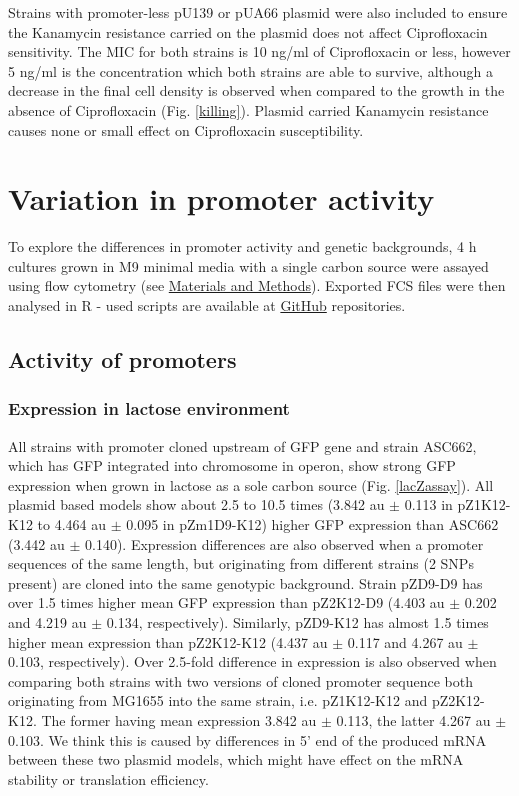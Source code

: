 Strains with promoter-less pU139 or pUA66 plasmid were also included to ensure the Kanamycin resistance carried on the plasmid does not affect Ciprofloxacin sensitivity.
The MIC for both strains is 10 ng/ml of Ciprofloxacin or less, however 5 ng/ml is the concentration which both strains are able to survive, although a decrease in the final cell density is observed when compared to the growth in the absence of Ciprofloxacin (Fig. \ref{killing}).
Plasmid carried Kanamycin resistance causes none or small effect on Ciprofloxacin susceptibility.


\section{Variation in promoter activity}
To explore the differences in promoter activity and genetic backgrounds, 4 h cultures grown in M9 minimal media with a single carbon source were assayed using flow cytometry (see \hyperlink{FC}{Materials and Methods}).
Exported FCS files were then analysed in R - used scripts are available at \href{https://github.com/marketavlkova/}{GitHub} repositories.

\subsection{Activity of  promoters}
\subsubsection{Expression in lactose environment}
All strains with  promoter cloned upstream of GFP gene and strain ASC662, which has GFP integrated into chromosome in  operon, show strong GFP expression when grown in lactose as a sole carbon source (Fig. \ref{lacZassay}).
All plasmid based models show about 2.5 to 10.5 times (3.842 au $\pm$ 0.113 in pZ1\textunderscore K12-K12 to 4.464 au $\pm$ 0.095 in pZm1\textunderscore D9-K12) higher GFP expression than ASC662 (3.442 au $\pm$ 0.140).
Expression differences are also observed when a promoter sequences of the same length, but originating from different strains (2 SNPs present) are cloned into the same genotypic background.
Strain pZ\textunderscore D9-D9 has over 1.5 times higher mean GFP expression than pZ2\textunderscore K12-D9 (4.403 au $\pm$ 0.202 and 4.219 au $\pm$ 0.134, respectively).
Similarly, pZ\textunderscore D9-K12 has almost 1.5 times higher mean expression than pZ2\textunderscore K12-K12 (4.437 au $\pm$ 0.117 and 4.267 au $\pm$ 0.103, respectively).
Over 2.5-fold difference in expression is also observed when comparing both strains with two versions of cloned promoter sequence both originating from MG1655 into the same strain, i.e. pZ1\textunderscore K12-K12 and pZ2\textunderscore K12-K12.
The former having mean expression 3.842 au $\pm$ 0.113, the latter 4.267 au $\pm$ 0.103.
We think this is caused by differences in 5' end of the produced mRNA between these two plasmid models, which might have effect on the mRNA stability or translation efficiency.


